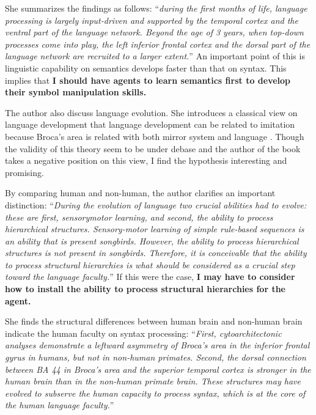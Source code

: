 \documentclass[12pt]{article}
\begin{document}
She summarizes the findings as follows: 
``\textit{during the
first months of life, language processing is largely input-driven and supported by the temporal
cortex and the ventral part of the language network. Beyond the age of 3 years, when
top-down processes come into play, the left inferior frontal cortex and the dorsal part of the
language network are recruited to a larger extent.}'' An important point of this is 
linguistic capability on semantics develops faster than that on syntax. This implies that 
\textbf{I should have agents to learn semantics first to develop their symbol manipulation skills.}

The author also discuss language evolution. She introduces a classical view on language development that 
language development can be related to imitation because Broca’s area is related with both 
mirror system and language \cite{Iacoboni99,Iacoboni05}. Though the validity of this theory seem to be 
under debase and the author of the book takes a negative position on this view, I find the hypothesis 
interesting and promising. 

By comparing human and non-human, the author clarifies an important distinction: 
``\textit{During the evolution of language two crucial abilities had to evolve: these are first, sensorymotor
learning, and second, the ability to process hierarchical structures. Sensory-motor
learning of simple rule-based sequences is an ability that is present songbirds. However,
the ability to process hierarchical structures is not present in songbirds. Therefore, it is
conceivable that the ability to process structural hierarchies is what should be considered
as a crucial step toward the language faculty.}'' If this were the case, \textbf{I may have to consider how to 
install the ability to process structural hierarchies for the agent.} 

She finds the structural differences between human brain and non-human brain indicate the human 
faculty on syntax processing: ``\textit{First, cytoarchitectonic analyses demonstrate a leftward asymmetry
of Broca’s area in the inferior frontal gyrus in humans, but not in non-human primates.
Second, the dorsal connection between BA 44 in Broca’s area and the superior temporal
cortex is stronger in the human brain than in the non-human primate brain. These structures may have 
evolved to subserve the human capacity to process syntax, which is at the core of the human language faculty.}''
\end{document}
